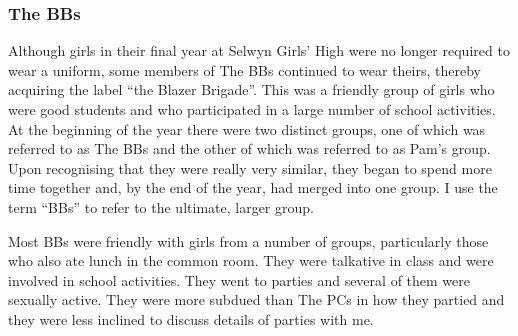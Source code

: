 \subsubsection{The BBs}
\label{ex:pamodette}

\vspace{5 mm}
 
\noindent Although girls in their final year at Selwyn Girls' High were no longer required to wear a uniform, some members of The BBs continued to wear theirs, thereby acquiring the label ``the Blazer Brigade''. This was a friendly group of girls who were good students and who participated in a large number of school activities. At the beginning of the year there were two distinct groups, one of which was referred to as The BBs and the other of which was referred to as Pam's group. Upon recognising that they were really very similar, they began to spend more time together and, by the end of the year, had merged into one group. I use the term ``BBs'' to refer to the ultimate, larger group. 



Most BBs were friendly with girls from a number of groups, particularly those who also ate lunch in the common room. They were talkative in class and were involved in school activities. They went to parties and several of them were sexually active. They were more subdued than The PCs in how they partied and they were less inclined to discuss details of parties with me. 

